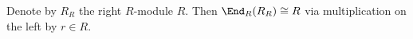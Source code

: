 Denote by $R_R$ the right $R$-module $R$. Then $\End_R(R_R)\cong R$ via multiplication
on the left by $r \in R$.
